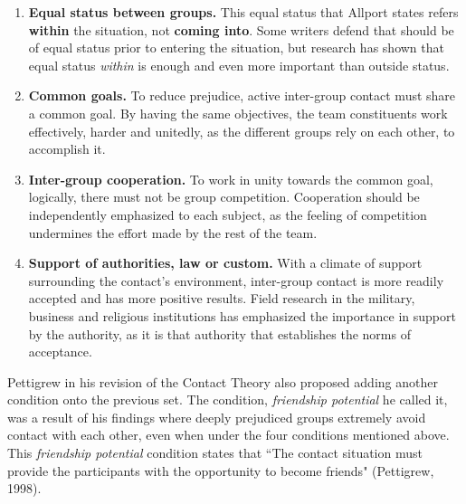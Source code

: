 \documentclass[runningheads]{llncs}
\begin{document}
\begin{enumerate}
\item \textbf{Equal status between groups.} This equal status that Allport states refers \textbf{within} the situation, not \textbf{coming into}. Some writers defend that should be of equal status prior to entering the situation, but research has shown that equal status \textit{within} is enough and even more important than outside status.
\item \textbf{Common goals.} To reduce prejudice, active inter-group contact must share a common goal. By having the same objectives, the team constituents work effectively, harder and unitedly, as the different groups rely on each other, to accomplish it.
\item \textbf{Inter-group cooperation.} To work in unity towards the common goal, logically, there must not be group competition. Cooperation should be independently emphasized to each subject, as the feeling of competition undermines the effort made by the rest of the team.
\item \textbf{Support of authorities, law or custom.} With a climate of support surrounding the contact's environment, inter-group contact is more readily accepted and has more positive results. Field research in the military, business and religious institutions has emphasized the importance in support by the authority, as it is that authority that establishes the norms of acceptance.
\end{enumerate}

\par Pettigrew in his revision of the Contact Theory also proposed adding another condition onto the previous set. The condition, \textit{friendship potential} he called it, was a result of his findings where deeply prejudiced groups extremely avoid contact with each other, even when under the four conditions mentioned above. This \textit{friendship potential} condition states that ``The contact situation must provide the participants with the opportunity to become friends" (Pettigrew, 1998).
\end{document}
